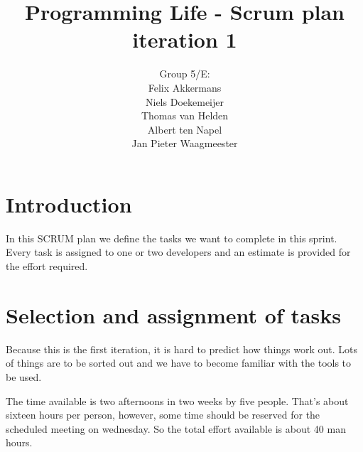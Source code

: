 \documentclass[a4paper]{article}
\title{Programming Life - Scrum plan iteration 1}
\author{Group 5/E:\\
Felix Akkermans \\
Niels Doekemeijer \\
Thomas van Helden \\
Albert ten Napel \\
Jan Pieter Waagmeester}
\begin{document}
\maketitle

\section{Introduction}
In this SCRUM plan we define the tasks we want to complete in this sprint. Every task is assigned to one or two developers and an estimate is provided for the effort required.

\section{Selection and assignment of tasks}
Because this is the first iteration, it is hard to predict how things work out. Lots of things are to be sorted out and we have to become familiar with the tools to be used.

The time available is two afternoons in two weeks by five people. That's about sixteen hours per person, however, some time should be reserved for the scheduled meeting on wednesday. So the total effort available is about 40 man hours.
\end{document}
